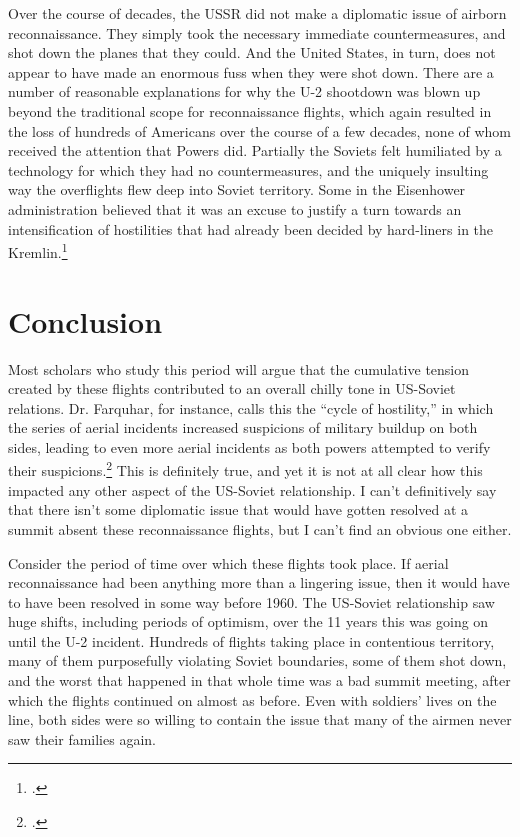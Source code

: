 \documentclass[12pt]{article}
\begin{document}
Over the course of decades, the USSR did not make a diplomatic issue of airborn reconnaissance. They simply took the necessary immediate countermeasures, and shot down the planes that they could. And the United States, in turn, does not appear to have made an enormous fuss when they were shot down. There are a number of reasonable explanations for why the U-2 shootdown was blown up beyond the traditional scope for reconnaissance flights, which again resulted in the loss of hundreds of Americans over the course of a few decades, none of whom received the attention that Powers did. Partially the Soviets felt humiliated by a technology for which they had no countermeasures, and the uniquely insulting way the overflights flew deep into Soviet territory. Some in the Eisenhower administration believed that it was an excuse to justify a turn towards an intensification of hostilities that had already been decided by hard-liners in the Kremlin.\footcite[p.~328]{kistiakowsky_scientist_1976}

\section{Conclusion}
Most scholars who study this period will argue that the cumulative tension created by these flights contributed to an overall chilly tone in US-Soviet relations. Dr. Farquhar, for instance, calls this the ``cycle of hostility,'' in which the series of aerial incidents increased suspicions of military buildup on both sides, leading to even more aerial incidents as both powers attempted to verify their suspicions.\footcite[p.~43]{farquhar_aerial_2015} This is definitely true, and yet it is not at all clear how this impacted any other aspect of the US-Soviet relationship. I can't definitively say that there isn't some diplomatic issue that would have gotten resolved at a summit absent these reconnaissance flights, but I can't find an obvious one either.

Consider the period of time over which these flights took place. If aerial reconnaissance had been anything more than a lingering issue, then it would have to have been resolved in some way before 1960. The US-Soviet relationship saw huge shifts, including periods of optimism, over the 11 years this was going on until the U-2 incident. Hundreds of flights taking place in contentious territory, many of them purposefully violating Soviet boundaries, some of them shot down, and the worst that happened in that whole time was a bad summit meeting, after which the flights continued on almost as before. Even with soldiers' lives on the line, both sides were so willing to contain the issue that many of the airmen never saw their families again.
\end{document}
